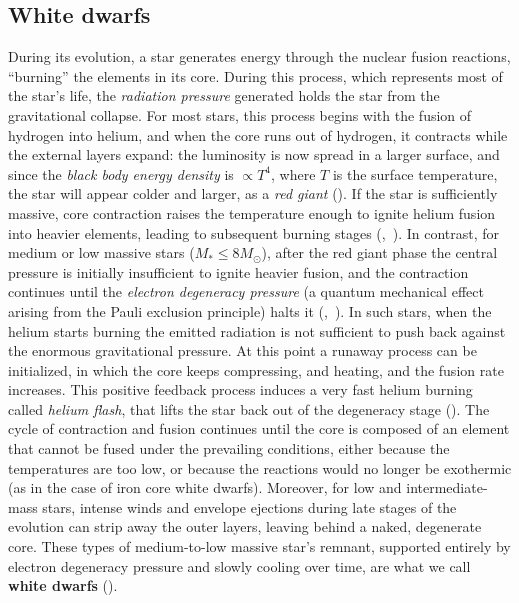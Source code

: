 \subsection{White dwarfs}
During its evolution, a star generates energy through the nuclear fusion reactions, ``burning'' the elements in its core. 
During this process, which represents most of the star's life, the \textit{radiation pressure} generated holds the star from the gravitational collapse. 
For most stars, this process begins with the fusion of hydrogen into helium, and when the core runs out of hydrogen, it contracts while the external layers expand: the luminosity is now spread in a larger surface, and since the \textit{black body energy density} is $\propto T^4$, where $T$ is the surface temperature, the star will appear colder and larger, as a \textit{red giant} ({\cite{on_red_giant_phase}}).
If the star is sufficiently massive, core contraction raises the temperature enough to ignite helium fusion into heavier elements, leading to subsequent burning stages ({\cite{Hoyle:1954zz},~\cite{RevModPhys.29.547}}).  
In contrast, for medium or low massive stars ($M_*\le 8M_\odot$), after the red giant phase the central pressure is initially insufficient to ignite heavier fusion, and the contraction continues until the \textit{electron degeneracy pressure} (a quantum mechanical effect arising from the Pauli exclusion principle) halts it ({\cite{Bradt},~\cite{Chandrasekhar}}).
In such stars, when the helium starts burning the emitted radiation is not sufficient to push back against the enormous gravitational pressure.
At this point a runaway process can be initialized, in which the core keeps compressing, and heating, and the fusion rate increases.
This positive feedback process induces a very fast helium burning called \textit{helium flash}, that lifts the star back out of the degeneracy stage ({\cite{on_helium_flash}}).
The cycle of contraction and fusion continues until the core is composed of an element that cannot be fused under the prevailing conditions, either because the temperatures are too low, or because the reactions would no longer be exothermic (as in the case of iron core white dwarfs).  
Moreover, for low and intermediate-mass stars, intense winds and envelope ejections during late stages of the evolution can strip away the outer layers, leaving behind a naked, degenerate core.
These types of medium-to-low massive star's remnant, supported entirely by electron degeneracy pressure and slowly cooling over time, are what we call \textbf{white dwarfs} ({\cite{Bradt}}).

